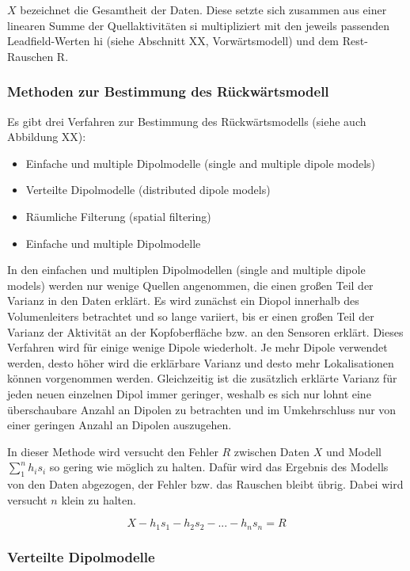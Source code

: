 \documentclass[doc,a4paper,12pt]{apa6}
\begin{document}
$X$ bezeichnet die Gesamtheit der Daten. Diese setzte sich zusammen aus einer linearen Summe der Quellaktivitäten si multipliziert mit den jeweils passenden Leadfield-Werten hi (siehe Abschnitt XX, Vorwärtsmodell) und dem Rest-Rauschen R.

\subsubsection{Methoden zur Bestimmung des Rückwärtsmodell}

Es gibt drei Verfahren zur Bestimmung des Rückwärtsmodells (siehe auch Abbildung XX):

\begin{itemize}
\item Einfache und multiple Dipolmodelle (single and multiple dipole models)
\item Verteilte Dipolmodelle (distributed dipole models)
\item Räumliche Filterung (spatial filtering)
\item Einfache und multiple Dipolmodelle
\end{itemize}

In den einfachen und multiplen Dipolmodellen (single and multiple dipole models) werden nur wenige Quellen angenommen, die einen großen Teil der Varianz in den Daten erklärt. Es wird zunächst ein Diopol innerhalb des Volumenleiters betrachtet und so lange variiert, bis er einen großen Teil der Varianz der Aktivität an der Kopfoberfläche bzw. an den Sensoren erklärt. Dieses Verfahren wird für einige wenige Dipole wiederholt. Je mehr Dipole verwendet werden, desto höher wird die erklärbare Varianz und desto mehr Lokalisationen können vorgenommen werden. Gleichzeitig ist die zusätzlich erklärte Varianz für jeden neuen einzelnen Dipol immer geringer, weshalb es sich nur lohnt eine überschaubare Anzahl an Dipolen zu betrachten und im Umkehrschluss nur von einer geringen Anzahl an Dipolen auszugehen.

In dieser Methode wird versucht den Fehler $R$ zwischen Daten $X$ und Modell $\sum^n_1{h_i s_i}$ so gering wie möglich zu halten. Dafür wird das Ergebnis des Modells von den Daten abgezogen, der Fehler bzw. das Rauschen bleibt übrig. Dabei wird versucht $n$ klein zu halten.

\begin{equation}
X - h_1 s_1 - h_2 s_2 - ... - h_n s_n = R
\end{equation}

\subsubsection{Verteilte Dipolmodelle}
\end{document}

